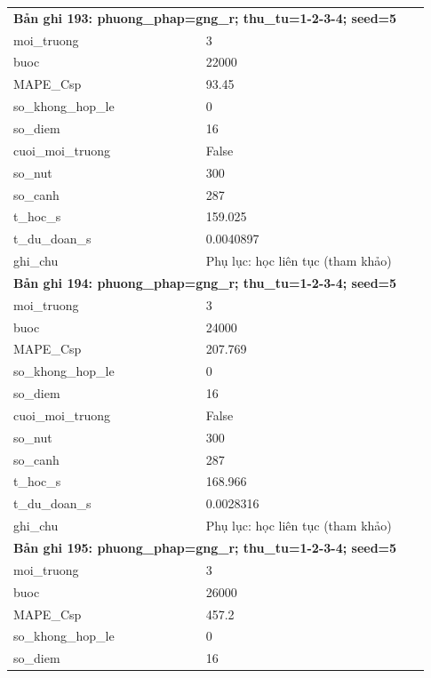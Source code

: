 \begin{longtable}{p{0.43\linewidth}p{0.50\linewidth}}
\midrule
\multicolumn{2}{p{0.95\linewidth}}{\textbf{Bản ghi 193: phuong\_phap=gng\_r; thu\_tu=1-2-3-4; seed=5}} \\
moi\_\allowbreak truong & 3 \\
buoc & 22000 \\
MAPE\_\allowbreak Csp & 93.45 \\
so\_\allowbreak khong\_\allowbreak hop\_\allowbreak le & 0 \\
so\_\allowbreak diem & 16 \\
cuoi\_\allowbreak moi\_\allowbreak truong & False \\
so\_\allowbreak nut & 300 \\
so\_\allowbreak canh & 287 \\
t\_\allowbreak hoc\_\allowbreak s & 159.025 \\
t\_\allowbreak du\_\allowbreak doan\_\allowbreak s & 0.0040897 \\
ghi\_\allowbreak chu & Phụ lục: học liên tục (tham khảo) \\
\midrule
\multicolumn{2}{p{0.95\linewidth}}{\textbf{Bản ghi 194: phuong\_phap=gng\_r; thu\_tu=1-2-3-4; seed=5}} \\
moi\_\allowbreak truong & 3 \\
buoc & 24000 \\
MAPE\_\allowbreak Csp & 207.769 \\
so\_\allowbreak khong\_\allowbreak hop\_\allowbreak le & 0 \\
so\_\allowbreak diem & 16 \\
cuoi\_\allowbreak moi\_\allowbreak truong & False \\
so\_\allowbreak nut & 300 \\
so\_\allowbreak canh & 287 \\
t\_\allowbreak hoc\_\allowbreak s & 168.966 \\
t\_\allowbreak du\_\allowbreak doan\_\allowbreak s & 0.0028316 \\
ghi\_\allowbreak chu & Phụ lục: học liên tục (tham khảo) \\
\midrule
\multicolumn{2}{p{0.95\linewidth}}{\textbf{Bản ghi 195: phuong\_phap=gng\_r; thu\_tu=1-2-3-4; seed=5}} \\
moi\_\allowbreak truong & 3 \\
buoc & 26000 \\
MAPE\_\allowbreak Csp & 457.2 \\
so\_\allowbreak khong\_\allowbreak hop\_\allowbreak le & 0 \\
so\_\allowbreak diem & 16 \\

\end{longtable}
